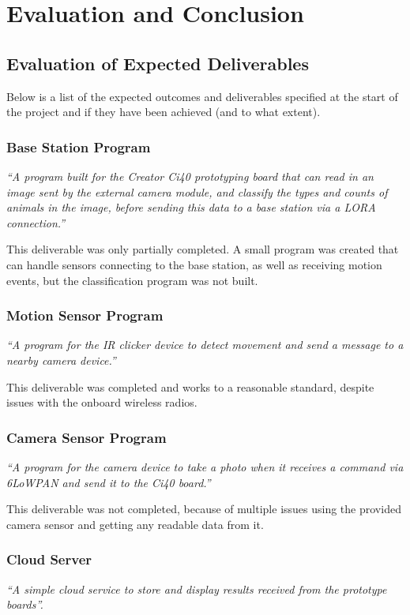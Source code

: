 \chapter{Evaluation and Conclusion}

\section{Evaluation of Expected Deliverables}
Below is a list of the expected outcomes and deliverables specified at the
start of the project and if they have been achieved (and to what extent).

\subsection{Base Station Program}
\textit{``A program built for the Creator Ci40 prototyping board that can
read in an image sent by the external camera module, and classify the types
and counts of animals in the image, before sending this data to a base
station via a LORA connection.''}

\noindent
This deliverable was only partially completed. A small program was created
that can handle sensors connecting to the base station, as well as receiving
motion events, but the classification program was not built.

\subsection{Motion Sensor Program}
\textit{``A program for the IR clicker device to detect movement and send a
message to a nearby camera device.''}

\noindent
This deliverable was completed and works to a reasonable standard, despite
issues with the onboard wireless radios.

\subsection{Camera Sensor Program}
\textit{``A program for the camera device to take a photo when it receives a
command via 6LoWPAN and send it to the Ci40 board.''}

\noindent
This deliverable was not completed, because of multiple issues using the
provided camera sensor and getting any readable data from it.

\subsection{Cloud Server}
\textit{``A simple cloud service to store and display results received from the
prototype boards''.}

